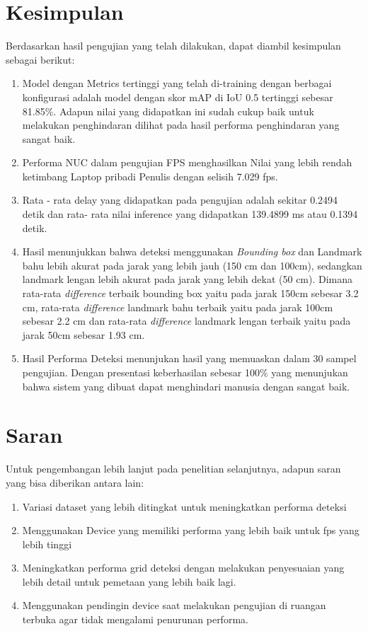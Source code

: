 \section{Kesimpulan}
\label{sec:kesimpulan}


Berdasarkan hasil pengujian yang telah dilakukan, dapat diambil kesimpulan sebagai berikut:

\begin{enumerate}
  \item Model dengan Metrics tertinggi yang telah di-training dengan berbagai konfigurasi adalah model dengan skor mAP di IoU 0.5 tertinggi sebesar 81.85\%. Adapun nilai yang didapatkan ini sudah cukup baik untuk melakukan penghindaran dilihat pada hasil performa penghindaran yang sangat baik.
  \item Performa NUC dalam pengujian FPS menghasilkan Nilai yang lebih rendah ketimbang Laptop pribadi Penulis dengan selisih 7.029 fps.
  \item Rata - rata delay yang didapatkan pada pengujian adalah sekitar 0.2494 detik dan rata- rata nilai inference yang didapatkan 139.4899 ms atau 0.1394 detik.
  \item Hasil menunjukkan bahwa deteksi menggunakan \emph{Bounding box} dan Landmark bahu lebih akurat pada jarak yang lebih jauh (150 cm dan 100cm), sedangkan landmark lengan lebih akurat pada jarak yang lebih dekat (50 cm). Dimana rata-rata \emph{difference} terbaik bounding box yaitu pada jarak 150cm sebesar 3.2 cm, rata-rata \emph{difference} landmark bahu terbaik yaitu pada jarak 100cm sebesar 2.2 cm dan rata-rata \emph{difference} landmark lengan terbaik yaitu pada jarak 50cm sebesar 1.93 cm.
  \item Hasil Performa Deteksi menunjukan hasil yang memuaskan dalam 30 sampel pengujian. Dengan presentasi keberhasilan sebesar 100\% yang menunjukan bahwa sistem yang dibuat dapat menghindari manusia dengan sangat baik.

\end{enumerate}

\section{Saran}
\label{chap:saran}

Untuk pengembangan lebih lanjut pada penelitian selanjutnya, adapun saran yang bisa diberikan antara lain:

\begin{enumerate}

  \item Variasi dataset yang lebih ditingkat untuk meningkatkan performa deteksi
  \item Menggunakan Device yang memiliki performa yang lebih baik untuk fps yang lebih tinggi
  \item Meningkatkan performa grid deteksi dengan melakukan penyesuaian yang lebih detail untuk pemetaan yang lebih baik lagi.
  \item Menggunakan pendingin device saat melakukan pengujian di ruangan terbuka agar tidak mengalami penurunan performa.
\end{enumerate}